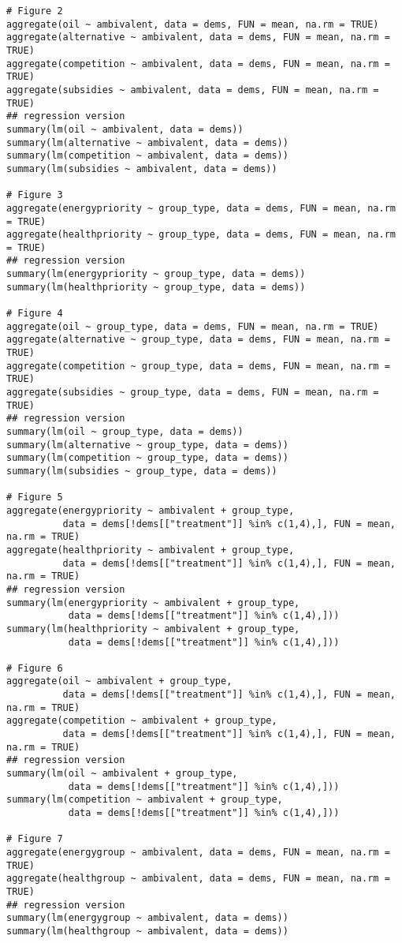 \documentclass[a4paper]{exam}
\begin{document}
\begin{verbatim}
# Figure 2
aggregate(oil ~ ambivalent, data = dems, FUN = mean, na.rm = TRUE)
aggregate(alternative ~ ambivalent, data = dems, FUN = mean, na.rm = TRUE)
aggregate(competition ~ ambivalent, data = dems, FUN = mean, na.rm = TRUE)
aggregate(subsidies ~ ambivalent, data = dems, FUN = mean, na.rm = TRUE)
## regression version
summary(lm(oil ~ ambivalent, data = dems))
summary(lm(alternative ~ ambivalent, data = dems))
summary(lm(competition ~ ambivalent, data = dems))
summary(lm(subsidies ~ ambivalent, data = dems))

# Figure 3
aggregate(energypriority ~ group_type, data = dems, FUN = mean, na.rm = TRUE)
aggregate(healthpriority ~ group_type, data = dems, FUN = mean, na.rm = TRUE)
## regression version
summary(lm(energypriority ~ group_type, data = dems))
summary(lm(healthpriority ~ group_type, data = dems))

# Figure 4
aggregate(oil ~ group_type, data = dems, FUN = mean, na.rm = TRUE)
aggregate(alternative ~ group_type, data = dems, FUN = mean, na.rm = TRUE)
aggregate(competition ~ group_type, data = dems, FUN = mean, na.rm = TRUE)
aggregate(subsidies ~ group_type, data = dems, FUN = mean, na.rm = TRUE)
## regression version
summary(lm(oil ~ group_type, data = dems))
summary(lm(alternative ~ group_type, data = dems))
summary(lm(competition ~ group_type, data = dems))
summary(lm(subsidies ~ group_type, data = dems))

# Figure 5
aggregate(energypriority ~ ambivalent + group_type, 
          data = dems[!dems[["treatment"]] %in% c(1,4),], FUN = mean, na.rm = TRUE)
aggregate(healthpriority ~ ambivalent + group_type, 
          data = dems[!dems[["treatment"]] %in% c(1,4),], FUN = mean, na.rm = TRUE)
## regression version
summary(lm(energypriority ~ ambivalent + group_type, 
           data = dems[!dems[["treatment"]] %in% c(1,4),]))
summary(lm(healthpriority ~ ambivalent + group_type, 
           data = dems[!dems[["treatment"]] %in% c(1,4),]))

# Figure 6
aggregate(oil ~ ambivalent + group_type, 
          data = dems[!dems[["treatment"]] %in% c(1,4),], FUN = mean, na.rm = TRUE)
aggregate(competition ~ ambivalent + group_type, 
          data = dems[!dems[["treatment"]] %in% c(1,4),], FUN = mean, na.rm = TRUE)
## regression version
summary(lm(oil ~ ambivalent + group_type, 
           data = dems[!dems[["treatment"]] %in% c(1,4),]))
summary(lm(competition ~ ambivalent + group_type, 
           data = dems[!dems[["treatment"]] %in% c(1,4),]))

# Figure 7
aggregate(energygroup ~ ambivalent, data = dems, FUN = mean, na.rm = TRUE)
aggregate(healthgroup ~ ambivalent, data = dems, FUN = mean, na.rm = TRUE)
## regression version
summary(lm(energygroup ~ ambivalent, data = dems))
summary(lm(healthgroup ~ ambivalent, data = dems))


\end{verbatim}
\end{document}
